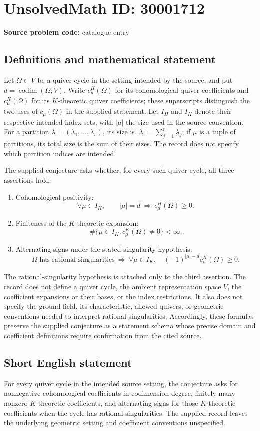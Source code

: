 \documentclass[11pt]{article}
\begin{document}
\section*{UnsolvedMath ID: 30001712}
\textbf{Source problem code:} catalogue entry
\subsection{Definitions and mathematical statement}
Let \(\Omega\subset V\) be a quiver cycle in the setting intended by the source, and put \(d=\operatorname{codim}(\Omega;V)\). Write \(c^H_\mu(\Omega)\) for its cohomological quiver coefficients and \(c^K_\mu(\Omega)\) for its \(K\)-theoretic quiver coefficients; these superscripts distinguish the two uses of \(c_\mu(\Omega)\) in the supplied statement. Let \(I_H\) and \(I_K\) denote their respective intended index sets, with \(|\mu|\) the size used in the source convention. For a partition \(\lambda=(\lambda_1,\ldots,\lambda_r)\), its size is \(|\lambda|=\sum_{j=1}^r\lambda_j\); if \(\mu\) is a tuple of partitions, its total size is the sum of their sizes. The record does not specify which partition indices are intended.

The supplied conjecture asks whether, for every such quiver cycle, all three assertions hold:
\begin{enumerate}
\item Cohomological positivity:
\[
\forall\mu\in I_H,\qquad |\mu|=d\ \Longrightarrow\ c^H_\mu(\Omega)\geq 0.
\]
\item Finiteness of the \(K\)-theoretic expansion:
\[
\#\{\mu\in I_K:c^K_\mu(\Omega)\neq 0\}<\infty.
\]
\item Alternating signs under the stated singularity hypothesis:
\[
\Omega\text{ has rational singularities}
\ \Longrightarrow\
\forall\mu\in I_K,\quad
(-1)^{|\mu|-d}c^K_\mu(\Omega)\geq 0.
\]
\end{enumerate}
The rational-singularity hypothesis is attached only to the third assertion. The record does not define a quiver cycle, the ambient representation space \(V\), the coefficient expansions or their bases, or the index restrictions. It also does not specify the ground field, its characteristic, allowed quivers, or geometric conventions needed to interpret rational singularities. Accordingly, these formulas preserve the supplied conjecture as a statement schema whose precise domain and coefficient definitions require confirmation from the cited source.
\subsection{Short English statement}
For every quiver cycle in the intended source setting, the conjecture asks for nonnegative cohomological coefficients in codimension degree, finitely many nonzero \(K\)-theoretic coefficients, and alternating signs for those \(K\)-theoretic coefficients when the cycle has rational singularities. The supplied record leaves the underlying geometric setting and coefficient conventions unspecified.
\end{document}
